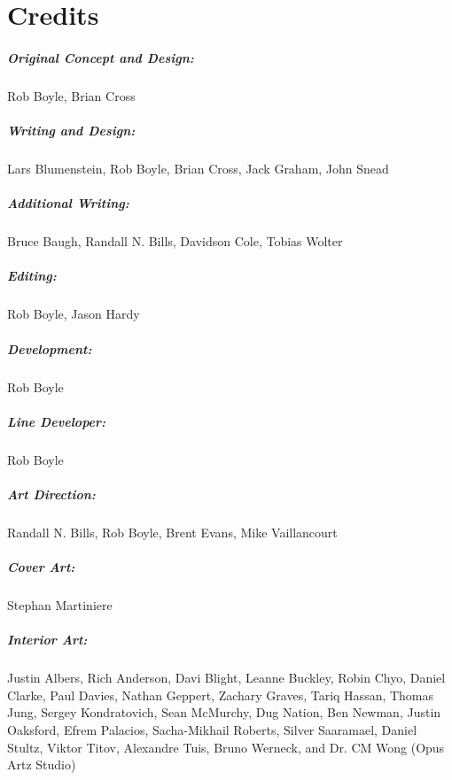 \chapter{Credits}
\label{chap:credits}

\paragraph{Original Concept and Design:}
\label{sec:orig-conc-design}
Rob Boyle, Brian Cross

\paragraph{Writing and Design:}
\label{sec:writing-design}
Lars Blumenstein, Rob Boyle, Brian Cross, Jack Graham, John Snead

\paragraph{Additional Writing:}
\label{sec:additional-writing}
Bruce Baugh, Randall N. Bills, Davidson Cole, Tobias Wolter

\paragraph{Editing:}
\label{sec:editing}
Rob Boyle, Jason Hardy

\paragraph{Development:}
\label{sec:development}
Rob Boyle

\paragraph{Line Developer:}
\label{sec:line-developer}
Rob Boyle

\paragraph{Art Direction:}
\label{sec:art-direction}
Randall N. Bills, Rob Boyle, Brent Evans, Mike Vaillancourt

\paragraph{Cover Art:}
\label{sec:cover-art}
Stephan Martiniere

\paragraph{Interior Art:}
\label{sec:interior-art}
Justin Albers, Rich Anderson, Davi Blight, Leanne Buckley, Robin
Chyo, Daniel Clarke, Paul Davies, Nathan Geppert, Zachary Graves,
Tariq Hassan, Thomas Jung, Sergey Kondratovich, Sean McMurchy, Dug
Nation, Ben Newman, Justin Oaksford, Efrem Palacios, Sacha-Mikhail
Roberts, Silver Saaramael, Daniel Stultz, Viktor Titov, Alexandre
Tuis, Bruno Werneck, and Dr. CM Wong (Opus Artz Studio)

